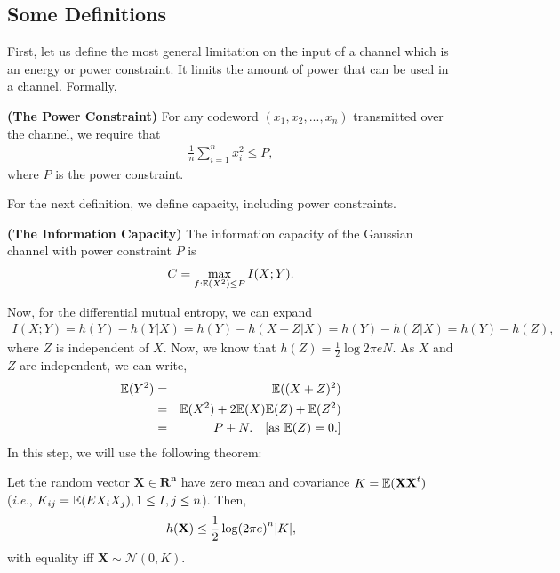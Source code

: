 \subsection{Some Definitions}
First, let us define the most general limitation on the input of a channel which is an energy or power constraint. It limits the amount of power that can be used in a channel. Formally,
%
\begin{tcolorbox}[boxrule=0pt,frame hidden,sharp corners,enhanced, opacityback=0, borderline west={2pt}{0pt}{red}]
\begin{defn} \textbf{(The Power Constraint)} For any codeword $(x_1, x_2,..., x_n)$ transmitted over the channel, we require that
%
\begin{eqnarray}
    \frac{1}{n}\sum_{i=1}^n x_i^2 \leq P,
\end{eqnarray}
%
where $P$ is the power constraint.
\end{defn}
\end{tcolorbox}
%
For the next definition, we define capacity, including power constraints.
%
\begin{tcolorbox}[boxrule=0pt,frame hidden,sharp corners,enhanced, opacityback=0, borderline west={2pt}{0pt}{red}]
\begin{defn} \textbf{(The Information Capacity)} The information capacity of the Gaussian channel with power constraint $P$ is
%
\begin{eqnarray}
    C = \max_{f:\mathbb{E}(X^2) \leq P} I(X;Y) \label{4.1.0}.
\end{eqnarray}
\end{defn}
\end{tcolorbox}
%
Now, for the differential mutual entropy, we can expand
%
\begin{eqnarray}
    I(X;Y) = h(Y)-h(Y|X) = h(Y)-h(X+Z|X) = h(Y) - h(Z|X) = h(Y) - h(Z) \label{4.1.1},
\end{eqnarray}
%
where $Z$ is independent of $X$. Now, we know that $h(Z) = \frac{1}{2}\log 2\pi e N$. As $X$ and $Z$ are independent, we can write,
%
\begin{eqnarray}
    \mathbb{E}(Y^2) &=& \mathbb{E}((X+Z)^2) \nonumber\\
    &=& \mathbb{E}(X^2)+2\mathbb{E}(X)\mathbb{E}(Z)+\mathbb{E}(Z^2) \nonumber\\
    &=& P+N. \quad [\text{as $\mathbb{E}(Z) = 0$}.]
\end{eqnarray}
%
In this step, we will use the following theorem:
%
\begin{tcolorbox}[boxrule=0pt,frame hidden,sharp corners,enhanced, opacityback=0, borderline west={2pt}{0pt}{blue}]
\begin{thm} Let the random vector $\mathbf{X} \in \mathbf{\mathbf{R}^n}$ have zero mean and covariance $K = \mathbb{E}(\mathbf{XX}^t)$ (\textit{i.e.}, $K_{ij}=\mathbb{E}(EX_iX_j), 1\leq I, j\leq n$). Then,
%
\begin{eqnarray}
    h(\mathbf{X}) \leq \frac{1}{2}\log(2\pi e)^n\abs{K},
\end{eqnarray}
%
with equality iff $\mathbf{X} \sim \mathcal{N}(0, K)$.
\end{thm}
\end{tcolorbox}
